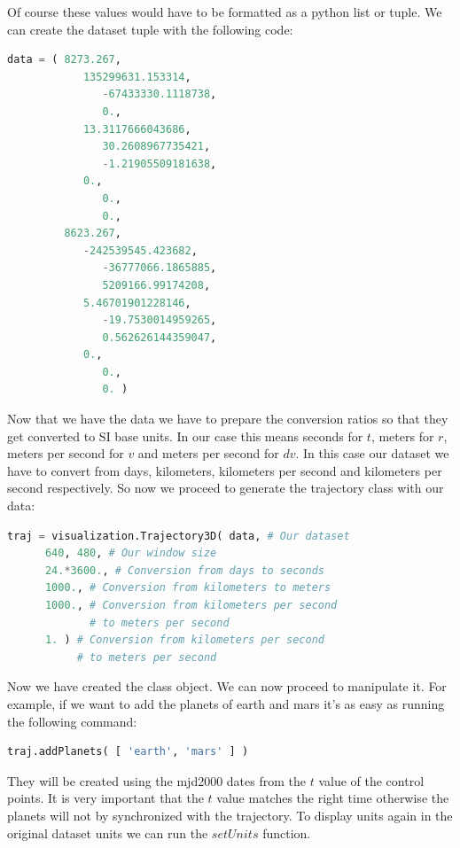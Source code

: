 \documentclass[a4paper,11pt]{article}
\begin{document}
Of course these values would have to be formatted as a python list or tuple. We can create the dataset tuple with the following code:

\begin{lstlisting}[language=Python,breakatwhitespace=true]
data = ( 8273.267,
            135299631.153314,
               -67433330.1118738,
               0.,
            13.3117666043686,
               30.2608967735421,
               -1.21905509181638,
            0.,
               0.,
               0.,
         8623.267,
            -242539545.423682,
               -36777066.1865885,
               5209166.99174208,
            5.46701901228146,
               -19.7530014959265,
               0.562626144359047,
            0.,
               0.,
               0. )
\end{lstlisting}

Now that we have the data we have to prepare the conversion ratios so that they get converted to \gls{SI}\cite{siunits} base units. In our case this means seconds for $t$, meters for $r$, meters per second for $v$ and meters per second for $dv$. In this case our dataset we have to convert from days, kilometers, kilometers per second and kilometers per second respectively. So now we proceed to generate the trajectory class with our data:

\begin{lstlisting}[language=Python,breakatwhitespace=true]
traj = visualization.Trajectory3D( data, # Our dataset
      640, 480, # Our window size
      24.*3600., # Conversion from days to seconds
      1000., # Conversion from kilometers to meters
      1000., # Conversion from kilometers per second
             # to meters per second
      1. ) # Conversion from kilometers per second
           # to meters per second
\end{lstlisting}

Now we have created the class object. We can now proceed to manipulate it. For example, if we want to add the planets of earth and mars it's as easy as running the following command:

\begin{lstlisting}[language=Python,breakatwhitespace=true]
traj.addPlanets( [ 'earth', 'mars' ] )
\end{lstlisting}

They will be created using the \gls{mjd2000} dates from the $t$ value of the control points. It is very important that the $t$ value matches the right time otherwise the planets will not by synchronized with the trajectory. To display units again in the original dataset units we can run the $setUnits$ function.
\end{document}
